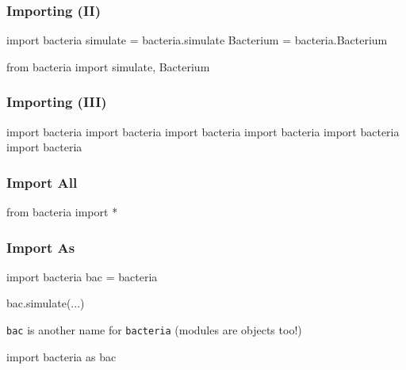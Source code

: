 \begin{frame}[fragile]
\frametitle{Importing (II)}

\begin{python}
import bacteria
simulate = bacteria.simulate
Bacterium = bacteria.Bacterium
\end{python}

\pause

\begin{python}
from bacteria import simulate, Bacterium
\end{python}

\end{frame}

\begin{frame}[fragile]
\frametitle{Importing (III)}

\begin{python}
import bacteria
import bacteria
import bacteria
import bacteria
import bacteria
import bacteria
\end{python}
\end{frame}

\begin{frame}[fragile]
\frametitle{Import All}

\begin{python}
from bacteria import *
\end{python}

\end{frame}

\begin{frame}[fragile]
\frametitle{Import As}

\begin{python}
import bacteria
bac = bacteria

bac.simulate(...)
\end{python}

\lstinline{bac} is another name for \lstinline{bacteria} (modules are objects too!)

\pause

\begin{python}
import bacteria as bac
\end{python}
\end{frame}


